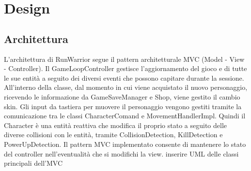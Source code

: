 \documentclass[a4paper,12pt]{report}
\begin{document}
\chapter{Design}
\section{Architettura}
L'architettura di RunWarrior segue il pattern architetturale MVC (Model - View - Controller). Il GameLoopController gestisce l'aggiornamento
del gioco e di tutte le sue entità a seguito dei diversi eventi che possono capitare durante la sessione. All'interno della classe, 
dal momento in cui viene acquistato il nuovo personaggio, ricevendo le informazione da GameSaveManager e Shop, viene gestito il cambio skin.
Gli input da tastiera per muovere il personaggio vengono gestiti tramite la comunicazione tra le classi CharacterComand e MovementHandlerImpl.
Quindi il Character è una entità reattiva che modifica il proprio stato a seguito delle diverse collisioni con le entità, 
tramite CollisionDetection, KillDetection e PowerUpDetection.
Il pattern MVC implementato consente di mantenere lo stato del controller nell'eventualità che si modifichi la view.
inserire UML delle classi principali dell'MVC
\end{document}
